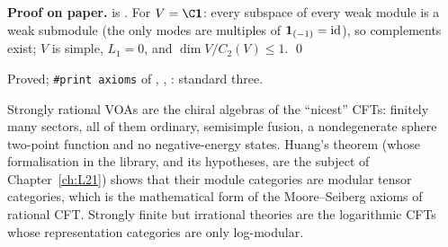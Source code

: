 \textbf{Proof on paper.}  is . For $V = \C\ltwelvevac$: every subspace of every weak
module is a weak submodule (the only modes are multiples of $\mathbf{1}_{(-1)} = \mathrm{id}$), so complements exist; $V$ is
simple, $L_1 = 0$, and $\dim V/C_2(V)\le1$. \qed

\begin{status}
Proved; \texttt{\#print axioms} of , ,
: standard three.
\end{status}

\begin{physics}
Strongly rational VOAs are the chiral algebras of the ``nicest'' CFTs: finitely many sectors, all of them ordinary,
semisimple fusion, a nondegenerate sphere two-point function and no negative-energy states. Huang's theorem (whose
formalisation in the library, and its hypotheses, are the subject of Chapter~\ref{ch:L21}) shows that their module categories are modular tensor categories, which is the mathematical form of the
Moore--Seiberg axioms of rational CFT. Strongly finite but irrational theories are the logarithmic CFTs whose
representation categories are only log-modular.
\end{physics}

